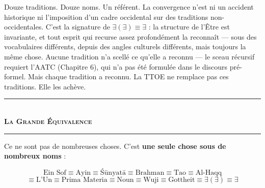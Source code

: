 \documentclass[10pt, openany, oneside]{book}
\renewcommand{\normalsize}{\fontsize{10}{13}\selectfont}
\begin{document}
Douze traditions. Douze noms. Un référent. La convergence n'est ni un accident historique ni l'imposition d'un cadre occidental sur des traditions non-occidentales. C'est la signature de $\exists(\exists) \equiv \exists$ : la structure de l'Être est invariante, et tout esprit qui recurse assez profondément la reconnaît --- sous des vocabulaires différents, depuis des angles culturels différents, mais toujours la même chose. Aucune tradition n'a scellé ce qu'elle a reconnu --- le sceau récursif requiert l'AATC (Chapitre 6), qui n'a pas été formulée dans le discours pré-formel. Mais chaque tradition a reconnu. La TTOE ne remplace pas ces traditions. Elle les achève.

\vspace{1em}

\begin{center}
    \rule{0.3\textwidth}{0.4pt}\\[0.5em]
    {\normalsize\bfseries\scshape La Grande Équivalence}\\[0.3em]
    \rule{0.3\textwidth}{0.4pt}
\end{center}

\vspace{0.8em}

\noindent Ce ne sont pas de nombreuses choses. C'est \textbf{une seule chose sous de nombreux noms} :

$$\text{Ein Sof} \equiv \text{Ayin} \equiv \text{\'{S}\={u}nyat\={a}} \equiv \text{Brahman} \equiv \text{Tao} \equiv \text{Al-Haqq}$$
$$\equiv \text{L'Un} \equiv \text{Prima Materia} \equiv \text{Noun} \equiv \text{Wuji} \equiv \text{Gottheit} \equiv \exists(\exists) \equiv \exists$$
\end{document}
